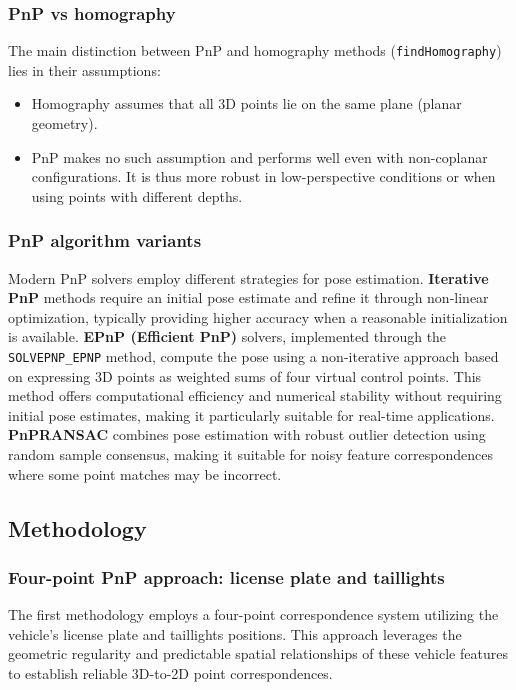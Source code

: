 \subsubsection{PnP vs homography}
The main distinction between PnP and homography methods (\texttt{findHomography}) lies in their assumptions:
\begin{itemize}
    \item Homography assumes that all 3D points lie on the same plane (planar geometry).
    \item PnP makes no such assumption and performs well even with non-coplanar configurations. It is thus more robust in low-perspective conditions or when using points with different depths.
\end{itemize}

\subsubsection{PnP algorithm variants}
Modern PnP solvers employ different strategies for pose estimation. \textbf{Iterative PnP} methods require an initial pose estimate and refine it through non-linear optimization, typically providing higher accuracy when a reasonable initialization is available. \textbf{EPnP (Efficient PnP)} solvers, implemented through the \texttt{SOLVEPNP\_EPNP} method, compute the pose using a non-iterative approach based on expressing 3D points as weighted sums of four virtual control points. This method offers computational efficiency and numerical stability without requiring initial pose estimates, making it particularly suitable for real-time applications. \textbf{PnPRANSAC} combines pose estimation with robust outlier detection using random sample consensus, making it suitable for noisy feature correspondences where some point matches may be incorrect.

\subsection{Methodology}
\subsubsection{Four-point PnP approach: license plate and taillights}
The first methodology employs a four-point correspondence system utilizing the vehicle's license plate and taillights positions. This approach leverages the geometric regularity and predictable spatial relationships of these vehicle features to establish reliable 3D-to-2D point correspondences.
